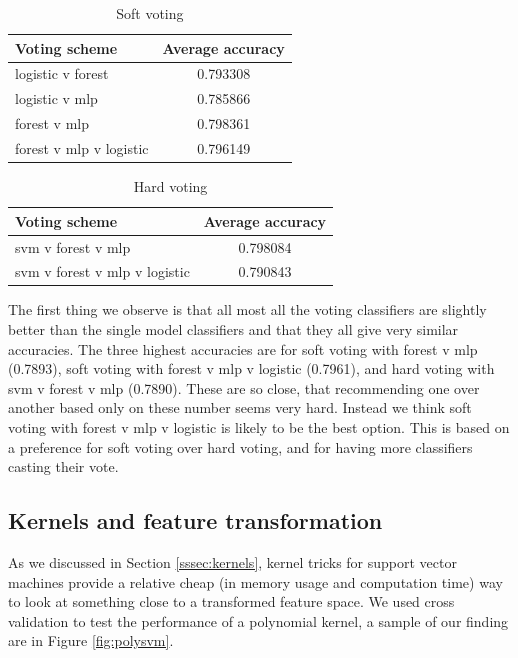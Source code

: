 \documentclass[parskip=half]{scrartcl}
\theoremstyle{definition}
\theoremstyle{remark}
\begin{document}
\begin{table} 
\caption{Soft voting} \label{tab:softvoting}
\begin{center}
\begin{tabular}{lc}
Voting scheme & Average accuracy \\ 
\hline 
\hline
logistic v forest & 0.793308 \\ 
logistic v mlp & 0.785866 \\ 
forest v mlp & 0.798361 \\ 
forest v mlp v logistic &  0.796149 \\ 
\end{tabular} 
\end{center} 
\end{table}
 
\begin{table} 
\caption{Hard voting} \label{tab:hardvoting}
\begin{center}
\begin{tabular}{lc}
Voting scheme & Average accuracy \\ 
\hline 
\hline
svm v forest v mlp &  0.798084 \\ 
svm v forest v mlp v logistic & 0.790843 \\ 
\end{tabular} 
\end{center} 
\end{table}

The first thing we observe is that all most all the voting classifiers are slightly better than the single model classifiers and that they all give very similar accuracies. 
The three highest accuracies are for soft voting with forest v mlp (0.7893), soft voting with forest v mlp v logistic (0.7961), and hard voting with svm v forest v mlp (0.7890).
These are so close, that recommending one over another based only on these number seems very hard.   
Instead we think soft voting with forest v mlp v logistic is likely to be the best option.
This is based on a preference for soft voting over hard voting, and for having more classifiers casting their vote.  

\subsection{Kernels and feature transformation}
 
As we discussed in Section \ref{sssec:kernels}, kernel tricks for support vector machines provide a relative cheap (in memory usage and computation time) way to look at something close to a transformed feature space. 
We used cross validation to test the performance of a polynomial kernel, a sample of our finding are in Figure \ref{fig:polysvm}.
\end{document}
